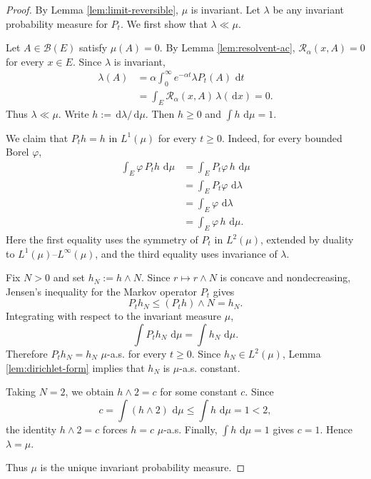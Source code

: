 \documentclass[11pt]{article}
\numberwithin{equation}{section}
\newcommand{\dd}{\,\mathrm d}
\newcommand{\1}{\mathbf 1}
\newcommand{\cB}{\mathcal B}
\begin{document}
\begin{proof}
By Lemma \ref{lem:limit-reversible}, $\mu$ is invariant. Let $\lambda$ be any
invariant probability measure for $P_t$. We first show that $\lambda\ll\mu$.

Let $A\in\cB(E)$ satisfy $\mu(A)=0$. By Lemma \ref{lem:resolvent-ac},
$\mathcal R_\alpha(x,A)=0$ for every $x\in E$. Since $\lambda$ is invariant,
\[
\begin{aligned}
        \lambda(A)
        &=
        \alpha\int_0^\infty e^{-\alpha t}\lambda P_t(A)\,\dd t        \\
        &=
        \int_E \mathcal R_\alpha(x,A)\,\lambda(\dd x)
        =0.
\end{aligned}
\]
Thus $\lambda\ll\mu$. Write $h:=\dd\lambda/\dd\mu$. Then $h\geq0$ and
$\int h\,\dd\mu=1$.

We claim that $P_t h=h$ in $L^1(\mu)$ for every $t\geq0$. Indeed, for every bounded
Borel $\varphi$,
\[
\begin{aligned}
        \int_E \varphi\,P_t h\,\dd\mu
        &=
        \int_E P_t\varphi\, h\,\dd\mu                         \\
        &=
        \int_E P_t\varphi\,\dd\lambda                         \\
        &=
        \int_E \varphi\,\dd\lambda                            \\
        &=
        \int_E \varphi\,h\,\dd\mu .
\end{aligned}
\]
Here the first equality uses the symmetry of $P_t$ in $L^2(\mu)$, extended by
duality to $L^1(\mu)$--$L^\infty(\mu)$, and the third equality uses invariance of
$\lambda$.

Fix $N>0$ and set $h_N:=h\wedge N$. Since $r\mapsto r\wedge N$ is concave and
nondecreasing, Jensen's inequality for the Markov operator $P_t$ gives
\[
        P_t h_N \leq (P_t h)\wedge N=h_N.
\]
Integrating with respect to the invariant measure $\mu$,
\[
        \int P_t h_N\,\dd\mu=\int h_N\,\dd\mu.
\]
Therefore $P_t h_N=h_N$ $\mu$-a.s. for every $t\geq0$. Since $h_N\in L^2(\mu)$,
Lemma \ref{lem:dirichlet-form} implies that $h_N$ is $\mu$-a.s. constant.

Taking $N=2$, we obtain $h\wedge2=c$ for some constant $c$. Since
\[
        c=\int (h\wedge2)\,\dd\mu\leq \int h\,\dd\mu=1<2,
\]
the identity $h\wedge2=c$ forces $h=c$ $\mu$-a.s. Finally,
$\int h\,\dd\mu=1$ gives $c=1$. Hence $\lambda=\mu$.

Thus $\mu$ is the unique invariant probability measure.
\end{proof}
\end{document}
